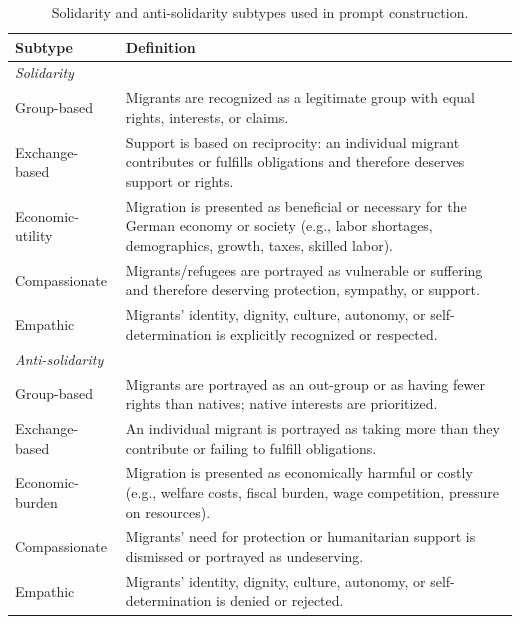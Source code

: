 \documentclass[12pt]{scrartcl}
\numberwithin{equation}{section}				%
\begin{document}
	\begin{table}[h]
		\centering
		\small
		\caption{Solidarity and anti-solidarity subtypes used in prompt construction.}
		\label{tab:solidarity_subtypes}
		\begin{tabular}{p{3.2cm}p{9.5cm}}
			\hline
			\textbf{Subtype} & \textbf{Definition} \\
			\hline
			\multicolumn{2}{l}{\textit{Solidarity}} \\
			Group-based & Migrants are recognized as a legitimate group with equal rights, interests, or claims. \\
			Exchange-based & Support is based on reciprocity: an individual migrant contributes or fulfills obligations and therefore deserves support or rights. \\
			Economic-utility & Migration is presented as beneficial or necessary for the German economy or society (e.g., labor shortages, demographics, growth, taxes, skilled labor). \\
			Compassionate & Migrants/refugees are portrayed as vulnerable or suffering and therefore deserving protection, sympathy, or support. \\
			Empathic & Migrants' identity, dignity, culture, autonomy, or self-determination is explicitly recognized or respected. \\
			\multicolumn{2}{l}{\textit{Anti-solidarity}} \\
			Group-based & Migrants are portrayed as an out-group or as having fewer rights than natives; native interests are prioritized. \\
			Exchange-based & An individual migrant is portrayed as taking more than they contribute or failing to fulfill obligations. \\
			Economic-burden & Migration is presented as economically harmful or costly (e.g., welfare costs, fiscal burden, wage competition, pressure on resources). \\
			Compassionate & Migrants' need for protection or humanitarian support is dismissed or portrayed as undeserving. \\
			Empathic & Migrants' identity, dignity, culture, autonomy, or self-determination is denied or rejected. \\
			\hline
		\end{tabular}
	\end{table}
	
	\clearpage
	
\end{document}
